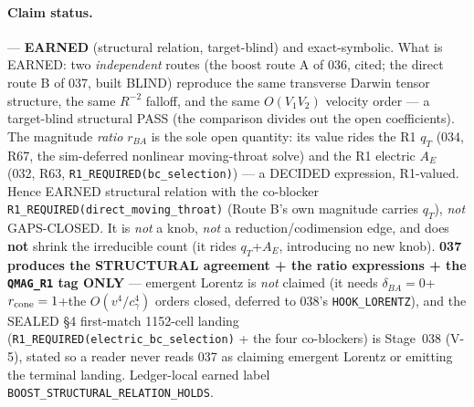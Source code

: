 \paragraph{Claim status.}
\StatusExactClosure{} --- \textbf{EARNED} (structural relation,
target-blind) and exact-symbolic. What is EARNED: two \emph{independent}
routes (the boost route A of 036, cited; the direct route B of 037, built
BLIND) reproduce the same transverse Darwin tensor structure, the same
\(R^{-2}\) falloff, and the same \(O(V_1V_2)\) velocity order --- a
target-blind structural PASS (the comparison divides out the open
coefficients). The magnitude \emph{ratio} \(r_{BA}\) is the sole open
quantity: its value rides the R1 \(q_T\) (034, R67, the sim-deferred
nonlinear moving-throat solve) and the R1 electric \(A_E\) (032, R63,
\texttt{R1\_REQUIRED(bc\_selection)}) --- a DECIDED expression, R1-valued.
Hence EARNED structural relation with the co-blocker
\texttt{R1\_REQUIRED(direct\_moving\_throat)} (Route B's own magnitude
carries \(q_T\)), \emph{not} GAPS-CLOSED. It is \emph{not} a knob,
\emph{not} a reduction/codimension edge, and does \textbf{not} shrink the
irreducible count (it rides \(q_T\)+\(A_E\), introducing no new knob).
\textbf{037 produces the STRUCTURAL agreement + the ratio expressions +
the \texttt{QMAG\_R1} tag ONLY} --- emergent Lorentz is \emph{not} claimed
(it needs \(\delta_{BA}=0\)+\(r_{\rm cone}=1\)+the \(O(v^4/c_\gamma^4)\)
orders closed, deferred to 038's \texttt{HOOK\_LORENTZ}), and the SEALED
\S4 first-match 1152-cell landing (\texttt{R1\_REQUIRED(electric\_bc\_selection)}
+ the four co-blockers) is Stage~038 (V-5), stated so a reader never reads
037 as claiming emergent Lorentz or emitting the terminal landing.
Ledger-local earned label \texttt{BOOST\_STRUCTURAL\_RELATION\_HOLDS}.

